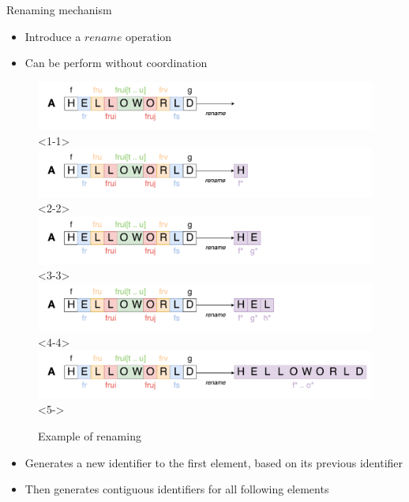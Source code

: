 \documentclass[10pt]{beamer}
\begin{document}
\begin{frame}{Renaming mechanism}
  \begin{itemize}
    \item Introduce a $rename$ operation
    \item Can be perform without coordination
  \end{itemize}
  \begin{figure}
    \includegraphics[scale=0.11]{img/renaming-1.png}<1-1>
    \includegraphics[scale=0.11]{img/renaming-2.png}<2-2>
    \includegraphics[scale=0.11]{img/renaming-3.png}<3-3>
    \includegraphics[scale=0.11]{img/renaming-4.png}<4-4>
    \includegraphics[scale=0.11]{img/renaming-5.png}<5->
    \caption{Example of renaming}
  \end{figure}
  \begin{itemize}
    \item<2-> Generates a new identifier to the first element, based on its previous identifier
    \item<3-> Then generates contiguous identifiers for all following elements
  \end{itemize}
\end{frame}
\end{document}
